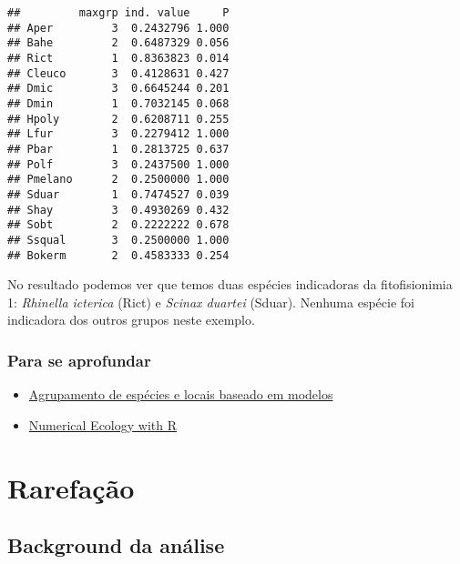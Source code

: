 \documentclass[
]{book}
\providecommand{\tightlist}{%
  \setlength{\itemsep}{0pt}\setlength{\parskip}{0pt}}
\begin{document}
\begin{verbatim}
##         maxgrp ind. value     P
## Aper         3  0.2432796 1.000
## Bahe         2  0.6487329 0.056
## Rict         1  0.8363823 0.014
## Cleuco       3  0.4128631 0.427
## Dmic         3  0.6645244 0.201
## Dmin         1  0.7032145 0.068
## Hpoly        2  0.6208711 0.255
## Lfur         3  0.2279412 1.000
## Pbar         1  0.2813725 0.637
## Polf         3  0.2437500 1.000
## Pmelano      2  0.2500000 1.000
## Sduar        1  0.7474527 0.039
## Shay         3  0.4930269 0.432
## Sobt         2  0.2222222 0.678
## Ssqual       3  0.2500000 1.000
## Bokerm       2  0.4583333 0.254
\end{verbatim}

No resultado podemos ver que temos duas espécies indicadoras da fitofisionimia 1: \emph{Rhinella icterica} (Rict) e \emph{Scinax duartei} (Sduar). Nenhuma espécie foi indicadora dos outros grupos neste exemplo.

\hypertarget{para-se-aprofundar}{%
\subsection{Para se aprofundar}\label{para-se-aprofundar}}

\begin{itemize}
\tightlist
\item
  \href{https://www.sciencedirect.com/science/article/pii/S0304380010006393?casa_token=0YLFbVbGj1IAAAAA:RFcrLHBDdt-NY5gpxCEAqlc8LMG0ayzChpMvaOFQkE10ftg2Us6PafgMQCSmCZZ21eb430e_lWo}{Agrupamento de espécies e locais baseado em modelos}
\item
  \href{http://adn.biol.umontreal.ca/~numericalecology/numecolR/}{Numerical Ecology with R}
\end{itemize}

\hypertarget{rarefauxe7uxe3o}{%
\chapter{Rarefação}\label{rarefauxe7uxe3o}}

\hypertarget{background-da-anuxe1lise}{%
\section{Background da análise}\label{background-da-anuxe1lise}}
\end{document}
